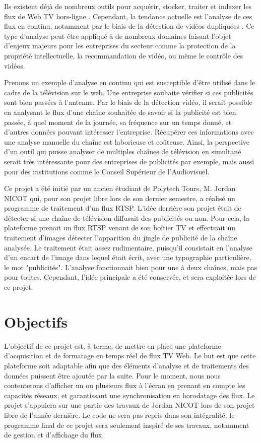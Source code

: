 \documentclass{polytech/polytech}
\begin{document}
Ils existent déjà de nombreux outils pour acquérir, stocker, traiter et indexer les flux de Web TV hors-ligne \cite{abduraman_tv_2012}. Cependant, la tendance actuelle est l’analyse de ces flux en continu, notamment par le biais de la détection de vidéos dupliquées \cite{liu_near-duplicate_2013}. Ce type d’analyse peut être appliqué à de nombreux domaines faisant l’objet d’enjeux majeurs pour les entreprises du secteur comme la protection de la propriété intellectuelle, la recommandation de vidéo, ou même le contrôle des vidéos.

Prenons un exemple d’analyse en continu qui est susceptible d’être utilisé dans le cadre de la télévision sur le web. Une entreprise souhaite vérifier si ces publicités sont bien passées à l’antenne. Par le biais de la détection vidéo, il serait possible en analysant le flux d’une chaîne souhaitée de savoir si la publicité est bien passée, à quel moment de la journée, sa fréquence sur un temps donné, et d’autres données pouvant intéresser l’entreprise. Récupérer ces informations avec une analyse manuelle du chaîne est laborieuse et coûteuse. Ainsi, la perspective d'un outil qui puisse analyser de multiples chaînes de télévision en simultané serait très intéressante pour des entreprises de publicités par exemple, mais aussi pour des institutions comme le Conseil Supérieur de l'Audiovisuel.

Ce projet a été initié par un ancien étudiant de Polytech Tours, M. Jordan NICOT qui, pour son projet libre lors de son dernier semestre, a réalisé un programme de traitement d’un flux RTSP. L’idée derrière son projet était de détecter si une chaîne de télévision diffusait des publicités ou non. Pour cela, la plateforme prenait un flux RTSP venant de son boîtier TV et effectuait un traitement d’images détecter l’apparition du jingle de publicité de la chaîne analysée. Le traitement était assez rudimentaire, puisqu’il consistait en l’analyse d’un encart de l’image dans lequel était écrit, avec une typographie particulière, le mot "publicités". L’analyse fonctionnait bien pour une à deux chaînes, mais pas pour toutes. Cependant, l’idée principale a été conservée, et sera exploitée lors de ce projet.


\section{Objectifs}

L’objectif de ce projet est, à terme, de mettre en place une plateforme d’acquisition et de formatage en temps réel de flux TV Web. Le but est que cette plateforme soit adaptable afin que des éléments d’analyse et de traitements des données puissent être ajoutée par la suite. Pour le moment, nous nous contenterons d’afficher un ou plusieurs flux à l’écran en prenant en compte les capacités réseaux, et garantissant une synchronisation en horodatage des flux. Le projet s’appuiera sur une partie des travaux de Jordan NICOT lors de son projet libre de l’année dernière. Le code ne sera pas repris dans son intégralité, le programme final de ce projet sera seulement inspiré de ses travaux, notamment de gestion et d’affichage du flux. 
\end{document}

